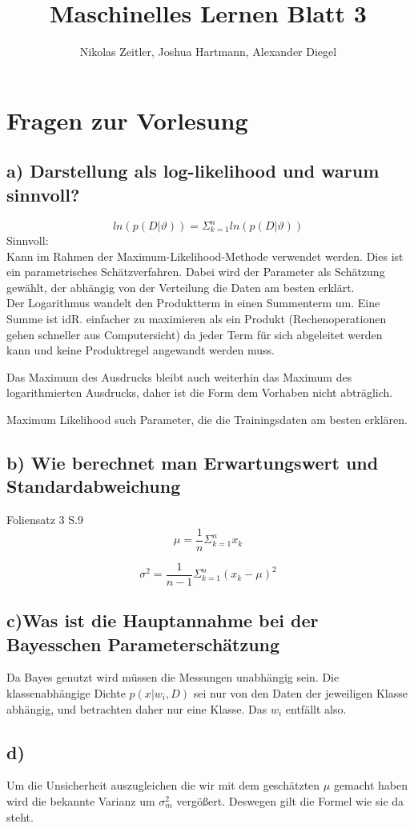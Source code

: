 \documentclass{scrartcl}
\author{Nikolas Zeitler, Joshua Hartmann, Alexander Diegel}
\title{Maschinelles Lernen Blatt 3}
\begin{document}
\maketitle
\section{Fragen zur Vorlesung}
\subsection*{a) Darstellung als log-likelihood und warum sinnvoll?}
\[ ln (p(D|\vartheta)) = \Sigma^n_{k=1} ln (p(D|\vartheta)) \]
Sinnvoll: \\
Kann im Rahmen der Maximum-Likelihood-Methode verwendet werden. Dies ist ein parametrisches Schätzverfahren. Dabei wird der Parameter als Schätzung gewählt, der abhängig von der Verteilung die Daten am besten erklärt.\\
Der Logarithmus wandelt den Produktterm in einen Summenterm um. Eine Summe ist idR. einfacher zu maximieren 
als ein Produkt (Rechenoperationen gehen schneller aus Computersicht) da jeder Term für sich abgeleitet werden kann und keine Produktregel angewandt werden muss.

Das Maximum des Ausdrucks bleibt auch weiterhin das Maximum des logarithmierten Ausdrucks, daher ist die Form dem Vorhaben nicht abträglich. 

Maximum Likelihood such Parameter, die die Trainingsdaten am besten erklären.
\subsection*{b) Wie berechnet man Erwartungswert und Standardabweichung}
Foliensatz 3 S.9 \\
\[\mu = \frac{1}{n}\Sigma^n_{k=1}x_k \]

\[\sigma^2 = \frac{1}{n-1}\Sigma^n_{k=1}(x_k-\mu)^2 \]

\subsection*{c)Was ist die Hauptannahme bei der Bayesschen Parameterschätzung}
Da Bayes genutzt wird müssen die Messungen unabhängig sein. %
Die klassenabhängige Dichte $p(x|w_i,D)$ sei nur von den Daten der jeweiligen Klasse abhängig, und betrachten daher nur eine Klasse. Das $w_i$ entfällt also.
\subsection*{d)}
Um die Unsicherheit auszugleichen die wir mit dem geschätzten $\mu$ gemacht haben wird die bekannte Varianz um $\sigma_m^2$ vergößert. Deswegen gilt die Formel wie sie da steht.
\end{document}
